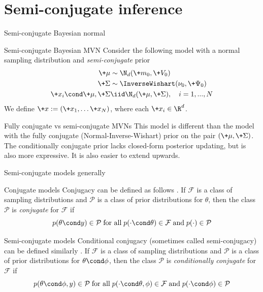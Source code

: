 \documentclass[10pt]{beamer}
\begin{document}
\section{Semi-conjugate inference}

\begin{frame}{Semi-conjugate Bayesian normal}

\begin{sblock}{Semi-conjugate Bayesian MVN}
Consider the following model with a normal sampling distribution and \textit{semi-conjugate} prior 
\begin{align*}
\+\mu &\sim \N_{d}(\+m_0,\+V_0 ) \\
\+\Sigma &\sim \InverseWishart(\nu_0,  \+\Psi_0) \\
\+x_i \cond \+\mu,  \+\Sigma &\iid \N_{d}( \+\mu , \+\Sigma), \quad i=1,...,N
\end{align*}
We define $\+x := (\+x_1,  \hdots \+x_N)$,  where each $\+x_i \in \R^d$.
\end{sblock}
\pause 

\vfill
\begin{sblock}{Fully conjugate vs semi-conjugate MVNs}
This model is different than the model with the fully conjugate (Normal-Inverse-Wishart) prior on the pair $(\+\mu, \+\Sigma)$.   The conditionally conjugate prior lacks closed-form posterior updating,  but is also more expressive.    It is also easier to extend upwards.
\end{sblock}

\end{frame}

\begin{frame}{Semi-conjugate models generally}

\begin{sblock}{Conjugate models}
Conjugacy can be defined as follows \cite{gelman2013bayesian}. If $\mathcal{F}$ is a class of sampling distributions and $\mathcal{P}$ is a class of prior distributions for $\theta$, then the class $\mathcal{P}$ is \textit{conjugate} for $\mathcal{F}$ if
\[  p(\theta \cond y ) \in \mathcal{P} \; \text{for all} \; p(\cdot \cond \theta) \in \mathcal{F} \; \text{and} \; p(\cdot) \in \mathcal{P} \]
\end{sblock}

\begin{sblock}{Semi-conjugate models}
Conditional conjugacy (sometimes called semi-conjugacy) can be defined similarly  \cite{gelman2013bayesian}.  If $\mathcal{F}$ is a class of sampling distributions and $\mathcal{P}$ is a class of prior distributions for $\theta \cond \phi$, then the class $\mathcal{P}$ is \textit{conditionally conjugate} for $\mathcal{F}$ if
\[  p(\theta \cond \phi, y) \in \mathcal{P} \; \text{for all} \; p(\cdot \cond \theta, \phi) \in \mathcal{F} \; \text{and} \; p(\cdot \cond \phi) \in \mathcal{P} \]
\end{sblock}
\pause 
{}
\end{frame}
\end{document}
